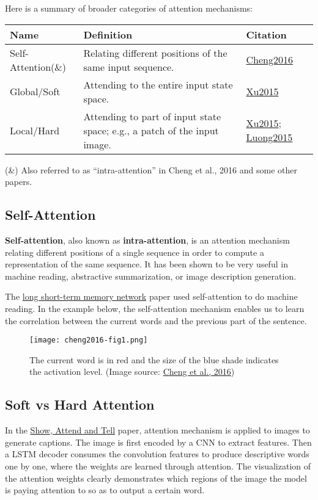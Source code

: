 \documentclass[12pt]{article}
\begin{document}
Here is a summary of broader categories of attention mechanisms:

\begin{table}[h]
\centering
\small
\begin{tabular}{|l|p{6.5cm}|l|}
\hline
\textbf{Name} & \textbf{Definition} & \textbf{Citation} \\
\hline
Self-Attention(\&) & Relating different positions of the same input sequence. & \href{https://arxiv.org/pdf/1601.06733.pdf}{Cheng2016} \\
Global/Soft & Attending to the entire input state space. & \href{http://proceedings.mlr.press/v37/xuc15.pdf}{Xu2015} \\
Local/Hard & Attending to part of input state space; e.g., a patch of the input image. & \href{http://proceedings.mlr.press/v37/xuc15.pdf}{Xu2015}; \href{https://arxiv.org/pdf/1508.04025.pdf}{Luong2015} \\
\hline
\end{tabular}
\end{table}

(\&) Also referred to as ``intra-attention'' in Cheng et al., 2016 and some other papers.

\subsection{Self-Attention}
\label{self-attention}
\textbf{Self-attention}, also known as \textbf{intra-attention}, is an attention mechanism relating different positions of a single sequence in order to compute a representation of the same sequence. It has been shown to be very useful in machine reading, abstractive summarization, or image description generation.

The \href{https://arxiv.org/pdf/1601.06733.pdf}{long short-term memory network} paper used self-attention to do machine reading. In the example below, the self-attention mechanism enables us to learn the correlation between the current words and the previous part of the sentence.

\begin{figure}[H]
    \centering
    \texttt{[image: cheng2016-fig1.png]}
    \caption{The current word is in red and the size of the blue shade indicates the activation level. (Image source: \href{https://arxiv.org/pdf/1601.06733.pdf}{Cheng et al., 2016})}
\end{figure}

\subsection{Soft vs Hard Attention}
In the \href{http://proceedings.mlr.press/v37/xuc15.pdf}{Show, Attend and Tell} paper, attention mechanism is applied to images to generate captions. The image is first encoded by a CNN to extract features. Then a LSTM decoder consumes the convolution features to produce descriptive words one by one, where the weights are learned through attention. The visualization of the attention weights clearly demonstrates which regions of the image the model is paying attention to so as to output a certain word.
\end{document}
